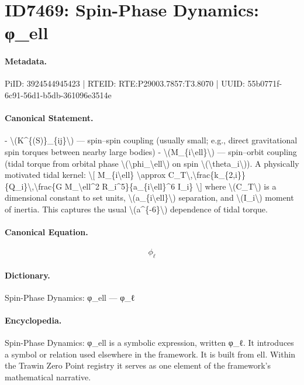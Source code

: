 \section*{ID7469: Spin-Phase Dynamics: φ\_ell}
\paragraph{Metadata.}
PiID: 3924544945423 | RTEID: RTE:P29003.7857:T3.8070 | UUID: 55b0771f-6c91-56d1-b5db-361096e3514e

\paragraph{Canonical Statement.}
- \textbackslash{}(K\textasciicircum{}\{(S)\}\_\{ij\}\textbackslash{}) — spin–spin coupling (usually small; e.g., direct gravitational spin torques between nearby large bodies) - \textbackslash{}(M\_\{i\textbackslash{}ell\}\textbackslash{}) — spin–orbit coupling (tidal torque from orbital phase \textbackslash{}(\textbackslash{}phi\_\textbackslash{}ell\textbackslash{}) on spin \textbackslash{}(\textbackslash{}theta\_i\textbackslash{})). A physically motivated tidal kernel: \textbackslash{}[ M\_\{i\textbackslash{}ell\} \textbackslash{}approx C\_T\textbackslash{},\textbackslash{}frac\{k\_\{2,i\}\}\{Q\_i\}\textbackslash{},\textbackslash{}frac\{G M\_\textbackslash{}ell\textasciicircum{}2 R\_i\textasciicircum{}5\}\{a\_\{i\textbackslash{}ell\}\textasciicircum{}6 I\_i\} \textbackslash{}] where \textbackslash{}(C\_T\textbackslash{}) is a dimensional constant to set units, \textbackslash{}(a\_\{i\textbackslash{}ell\}\textbackslash{}) separation, and \textbackslash{}(I\_i\textbackslash{}) moment of inertia. This captures the usual \textbackslash{}(a\textasciicircum{}\{-6\}\textbackslash{}) dependence of tidal torque.

\paragraph{Canonical Equation.}
\[
\phi_\ell
\]

\paragraph{Dictionary.}
Spin-Phase Dynamics: φ\_ell — φ\_ℓ

\paragraph{Encyclopedia.}
Spin-Phase Dynamics: φ\_ell is a symbolic expression, written φ\_ℓ. It introduces a symbol or relation used elsewhere in the framework. It is built from ell. Within the Trawin Zero Point registry it serves as one element of the framework's mathematical narrative.
